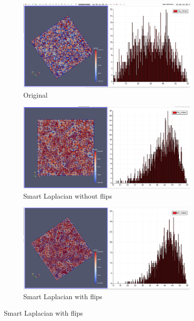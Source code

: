 \begin{figure}[h]
    \centering
    \begin{subfigure}[h]{1.0\textwidth}
        \centering
        \includegraphics[width=\textwidth]{images/original_1000.png}
        \caption{Original}
    \end{subfigure}
    \vspace{0.5 cm}

    \begin{subfigure}[h]{1.0\textwidth}
        \centering
        \includegraphics[width=\textwidth]{images/laplacian_no_flips_1000.png}
        \caption{Smart Laplacian without flips}
    \end{subfigure}
    \vspace{0.5 cm}
 
    \begin{subfigure}[h]{1.0\textwidth}
        \centering
        \includegraphics[width=\textwidth]{images/laplacian_1000.png}
        \caption{Smart Laplacian with flips}
    \end{subfigure}
	\vspace{0.5 cm}
\end{figure}

